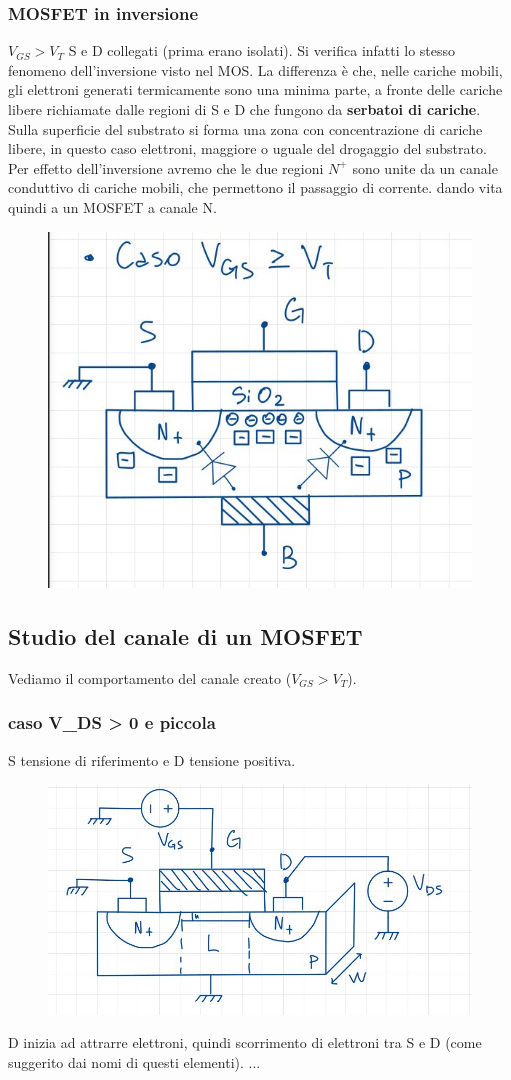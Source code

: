 \documentclass[11pt,a4paper,]{article}
\begin{document}
\subsubsection{MOSFET in inversione}
$V_{GS}>V_T$ S e D collegati (prima erano isolati). Si verifica infatti lo stesso fenomeno dell'inversione visto nel MOS.
La differenza è che, nelle cariche mobili, gli elettroni generati termicamente sono una minima parte, a fronte delle cariche libere richiamate dalle regioni di S e D che fungono da \textbf{serbatoi di cariche}.
Sulla superficie del substrato si forma una zona con concentrazione di cariche libere, in questo caso elettroni, maggiore o uguale del drogaggio del substrato. Per effetto dell'inversione avremo che le due regioni $N^+$ sono unite da un canale conduttivo di cariche mobili, che permettono il passaggio di corrente. dando vita quindi a un MOSFET a canale N.
\begin{figure}[H]
    \centering
    \includegraphics[width=0.5\linewidth]{img/mosfet inversione.png}
\end{figure}

\subsection{Studio del canale di un MOSFET}
Vediamo il comportamento del canale creato ($V_{GS}>V_T$).
\subsubsection{caso V\_DS > 0 e piccola}
S tensione di riferimento e D tensione positiva.
\begin{figure}[H]
    \centering
    \includegraphics[width=0.5\linewidth]{img/mosfet pic.png}
\end{figure}
D inizia ad attrarre elettroni, quindi scorrimento di elettroni tra S e D (come suggerito dai nomi di questi elementi). 
...
\end{document}
